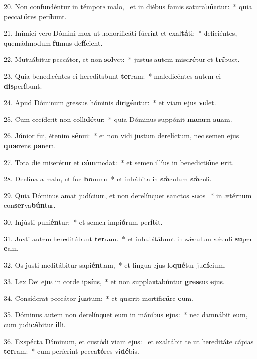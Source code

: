 20. Non confundéntur in témpore malo, \dag\  et in diébus famis satura\textbf{bún}tur:~*  quia pecca\textbf{tó}res per\textbf{í}bunt.\

21. Inimíci vero Dómini mox ut honorificáti fúerint et exal\textbf{tá}ti:~*  deficiéntes, quemádmodum \textbf{fu}mus de\textbf{fí}cient.\

22. Mutuábitur peccátor, et non \textbf{sol}vet:~*  justus autem mise\textbf{ré}tur et \textbf{trí}buet.\

23. Quia benedicéntes ei hereditábunt \textbf{ter}ram:~*  maledicéntes autem ei \textbf{dis}per\textbf{í}bunt.\

24. Apud Dóminum gressus hóminis diri\textbf{gén}tur:~*  et viam \textbf{e}jus \textbf{vo}let.\

25. Cum cecíderit non colli\textbf{dé}tur:~*  quia Dóminus suppónit \textbf{ma}num \textbf{su}am.\

26. Júnior fui, étenim \textbf{sé}nui:~*  et non vidi justum derelíctum, nec semen ejus \textbf{quæ}rens \textbf{pa}nem.\

27. Tota die miserétur et \textbf{cóm}modat:~*  et semen illíus in benedicti\textbf{ó}ne \textbf{e}rit.\

28. Declína a malo, et fac \textbf{bo}num:~*  et inhábita in \textbf{sǽ}culum \textbf{sǽ}culi.\

29. Quia Dóminus amat judícium, et non derelínquet sanctos \textbf{su}os:~*  in ætérnum con\textbf{ser}va\textbf{bún}tur.\

30. Injústi puni\textbf{én}tur:~*  et semen impi\textbf{ó}rum per\textbf{í}bit.\

31. Justi autem hereditábunt \textbf{ter}ram:~*  et inhabitábunt in sǽculum sǽculi \textbf{su}per \textbf{e}am.\

32. Os justi meditábitur sapi\textbf{én}tiam,~*  et lingua ejus lo\textbf{qué}tur ju\textbf{dí}cium.\

33. Lex Dei ejus in corde ip\textbf{sí}us,~*  et non supplantabúntur \textbf{gres}sus \textbf{e}jus.\

34. Consíderat peccátor \textbf{jus}tum:~*  et quærit mortifi\textbf{cá}re \textbf{e}um.\

35. Dóminus autem non derelínquet eum in mánibus \textbf{e}jus:~*  nec damnábit eum, cum judi\textbf{cá}bitur \textbf{il}li.\

36. Exspécta Dóminum, et custódi viam ejus: \dag\  et exaltábit te ut hereditáte cápias \textbf{ter}ram:~*  cum períerint pecca\textbf{tó}res vi\textbf{dé}bis.\

